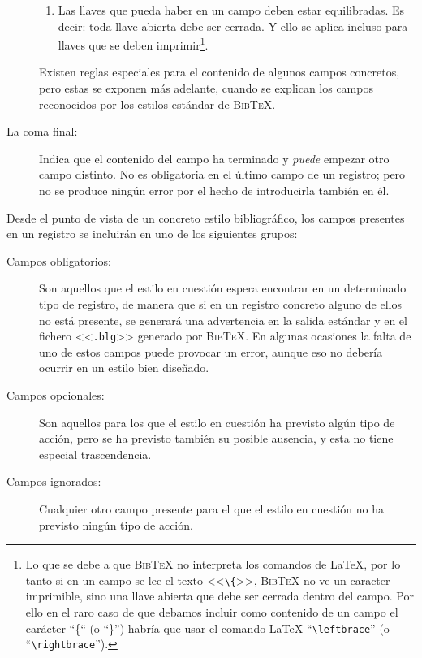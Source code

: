 \documentclass[a4paper,11pt]{article}
\def\btx-{\textsc{Bib\TeX}}
\def\ltx-{\LaTeX}
\def\ltr#1-{<<\texttt{#1}>>}
\def\tpf#1-{\ltr.#1-}
\def\cmd#1-{``\texttt{\textbackslash#1}''}
\begin{document}
\begin{description}
\begin{enumerate}
  \item Las  llaves que pueda haber  en un campo deben  estar equilibradas. Es
    decir: toda llave abierta debe ser  cerrada. Y ello se aplica incluso para
    llaves  que se  deben  imprimir\footnote{Lo que  se  debe a  que \btx-  no
      interpreta los comandos de \ltx-, por lo  tanto si en un campo se lee el
      texto \ltr  \textbackslash\{-, \btx- no ve un  caracter imprimible, sino
      una llave abierta que debe ser  cerrada dentro del campo. Por ello en el
      raro caso de que debamos incluir  como contenido de un campo el carácter
      ``\{`` (o  ``\}'') habría que usar  el comando \ltx-  \cmd leftbrace- (o
      \cmd rightbrace-).}.

  \end{enumerate}

  Existen  reglas especiales para  el contenido  de algunos  campos concretos,
  pero  estas  se  exponen  más   adelante,  cuando  se  explican  los  campos
  reconocidos por los estilos estándar de \btx-.

\item[La  coma  final:] Indica  que  el contenido  del  campo  ha terminado  y
  \emph{puede} empezar  otro campo  distinto. No es  obligatoria en  el último
  campo  de un  registro; pero  no se  produce ningún  error por  el  hecho de
  introducirla también en él.

\end{description}

Desde  el punto  de  vista de  un  concreto estilo  bibliográfico, los  campos
presentes en un registro se incluirán en uno de los siguientes grupos:

\begin{description}

\item[Campos  obligatorios:] Son  aquellos que  el estilo  en  cuestión espera
  encontrar  en un  determinado  tipo de  registro,  de manera  que  si en  un
  registro  concreto  alguno  de  ellos  no está  presente,  se  generará  una
  advertencia en  la salida estándar  y en el  fichero \tpf blg-  generado por
  \btx-. En algunas  ocasiones la falta de uno de  estos campos puede provocar
  un error, aunque eso no debería ocurrir en un estilo bien diseñado.

\item[Campos opcionales:] Son  aquellos para los que el  estilo en cuestión ha
  previsto  algún tipo  de  acción, pero  se  ha previsto  también su  posible
  ausencia, y esta no tiene especial trascendencia.

\item[Campos ignorados:] Cualquier  otro campo presente para el  que el estilo
  en cuestión no ha previsto ningún tipo de acción.

\end{description}
\end{document}
